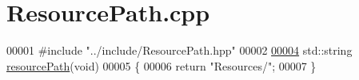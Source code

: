 \hypertarget{_resource_path_8cpp_source}{}\section{Resource\+Path.\+cpp}
\label{_resource_path_8cpp_source}

\begin{DoxyCode}
00001 \textcolor{preprocessor}{#include "../include/ResourcePath.hpp"}
00002 
\hypertarget{_resource_path_8cpp_source_l00004}{}\hyperlink{_resource_path_8cpp_a377b456e3964835648f2d726c2e4f510}{00004} std::string \hyperlink{_resource_path_8cpp_a377b456e3964835648f2d726c2e4f510}{resourcePath}(\textcolor{keywordtype}{void})
00005 \{
00006     \textcolor{keywordflow}{return} \textcolor{stringliteral}{"Resources/"};
00007 \}
\end{DoxyCode}
